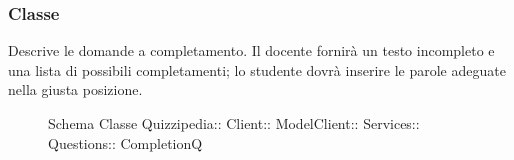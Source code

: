 \subsubsection{Classe }
Descrive le domande a completamento. Il docente fornirà un testo incompleto e una lista di possibili completamenti; lo studente dovrà inserire le parole adeguate nella giusta posizione.
\begin{figure}[H]
\centering
\noindent{}
\caption[Schema Classe CompletionQ]{Schema Classe Quizzipedia:: Client:: ModelClient:: Services:: Questions:: CompletionQ}
\end{figure}
